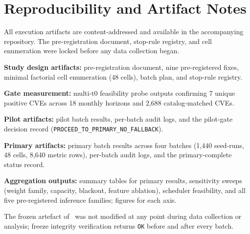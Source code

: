 \section{Reproducibility and Artifact Notes}
All execution artifacts are content-addressed and available in the accompanying repository. The pre-registration document, stop-rule registry, and cell enumeration were locked before any data collection began.

\textbf{Study design artifacts:} pre-registration document, nine pre-registered fixes, minimal factorial cell enumeration (48 cells), batch plan, and stop-rule registry.

\textbf{Gate measurement:} multi-t0 feasibility probe outputs confirming 7 unique positive CVEs across 18 monthly horizons and 2,688 catalog-matched CVEs.

\textbf{Pilot artifacts:} pilot batch results, per-batch audit logs, and the pilot-gate decision record (\texttt{PROCEED\_TO\_PRIMARY\_NO\_FALLBACK}).

\textbf{Primary artifacts:} primary batch results across four batches (1,440 seed-runs, 48 cells, 8,640 metric rows), per-batch audit logs, and the primary-complete status record.

\textbf{Aggregation outputs:} summary tables for primary results, sensitivity sweeps (weight family, capacity, blackout, feature ablation), scheduler feasibility, and all five pre-registered inference families; figures for each axis.

The frozen artefact of~\cite{Malla2026VulnPrio} was not modified at any point during data collection or analysis; freeze integrity verification returns \texttt{OK} before and after every batch.
